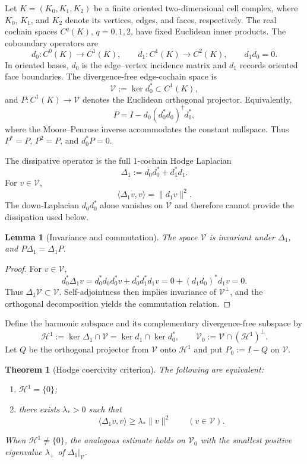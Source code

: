 \documentclass[11pt]{article}
\newtheorem{lemma}{Lemma}
\newtheorem{theorem}{Theorem}
\theoremstyle{remark}
\begin{document}
Let $K=(K_0,K_1,K_2)$ be a finite oriented two-dimensional cell complex, where $K_0$, $K_1$, and $K_2$ denote its vertices, edges, and faces, respectively. The real cochain spaces $C^q(K)$, $q=0,1,2$, have fixed Euclidean inner products. The coboundary operators are
\[
d_0:C^0(K)\longrightarrow C^1(K),
\qquad
d_1:C^1(K)\longrightarrow C^2(K),
\qquad
d_1d_0=0.
\]
In oriented bases, $d_0$ is the edge--vertex incidence matrix and $d_1$ records oriented face boundaries. The divergence-free edge-cochain space is
\[
\mathcal V:=\ker d_0^*\subset C^1(K),
\]
and $P:C^1(K)\to\mathcal V$ denotes the Euclidean orthogonal projector. Equivalently,
\[
P=I-d_0(d_0^*d_0)^\dagger d_0^*,
\]
where the Moore--Penrose inverse accommodates the constant nullspace. Thus $P^*=P$, $P^2=P$, and $d_0^*P=0$.

The dissipative operator is the full $1$-cochain Hodge Laplacian
\[
\Delta_1:=d_0d_0^*+d_1^*d_1.
\]
For $v\in\mathcal V$,
\begin{equation}
\langle\Delta_1v,v\rangle=\|d_1v\|^2.
\label{eq:hodgeenergy}
\end{equation}
The down-Laplacian $d_0d_0^*$ alone vanishes on $\mathcal V$ and therefore cannot provide the dissipation used below.

\begin{lemma}[Invariance and commutation]\label{lem:invariance}
The space $\mathcal V$ is invariant under $\Delta_1$, and $P\Delta_1=\Delta_1P$.
\end{lemma}

\begin{proof}
For $v\in\mathcal V$,
\[
d_0^*\Delta_1v=d_0^*d_0d_0^*v+d_0^*d_1^*d_1v=0+(d_1d_0)^*d_1v=0.
\]
Thus $\Delta_1\mathcal V\subset\mathcal V$. Self-adjointness then implies invariance of $\mathcal V^\perp$, and the orthogonal decomposition yields the commutation relation.
\end{proof}

Define the harmonic subspace and its complementary divergence-free subspace by
\begin{equation}
\mathcal H^1:=\ker\Delta_1\cap\mathcal V=\ker d_1\cap\ker d_0^*,
\qquad
\mathcal V_0:=\mathcal V\cap(\mathcal H^1)^\perp.
\label{eq:hodgedecomp}
\end{equation}
Let $Q$ be the orthogonal projector from $\mathcal V$ onto $\mathcal H^1$ and put $P_0:=I-Q$ on $\mathcal V$.

\begin{theorem}[Hodge coercivity criterion]\label{thm:coercivity}
The following are equivalent:
\begin{enumerate}
\item $\mathcal H^1=\{0\}$;
\item there exists $\lambda_*>0$ such that
\begin{equation}
\langle\Delta_1v,v\rangle\geq\lambda_*\|v\|^2
\qquad(v\in\mathcal V).
\label{eq:coercivity}
\end{equation}
\end{enumerate}
When $\mathcal H^1\neq\{0\}$, the analogous estimate holds on $\mathcal V_0$ with the smallest positive eigenvalue $\lambda_+$ of $\Delta_1|_{\mathcal V}$.
\end{theorem}
\end{document}
